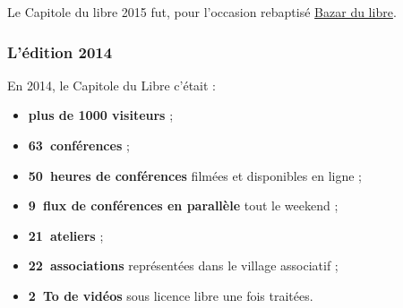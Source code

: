 Le Capitole du libre 2015 fut, pour l'occasion rebaptisé \href{http://bazardulibre.org}{Bazar du libre}.



\subsubsection{L'édition 2014}

\begin{minipage}{0.6\textwidth}
En 2014, le Capitole du Libre c'était :
\begin{itemize}[label=$\bullet$]
\item \textbf{plus de \num{1000} visiteurs} ;
\item \textbf{63~conférences} ;
\item \textbf{50~heures de conférences} filmées et disponibles en ligne ;
\item \textbf{9~flux de conférences en parallèle} tout le weekend ;
\item \textbf{21~ateliers} ;
\item \textbf{22~associations} représentées dans le village associatif ;
\item \textbf{\SI{2}{\tera o} de vidéos} sous licence libre une fois traitées.
\end{itemize}
\end{minipage}
\begin{minipage}{0.4\textwidth}
\begin{center}
\end{center}
\end{minipage}


